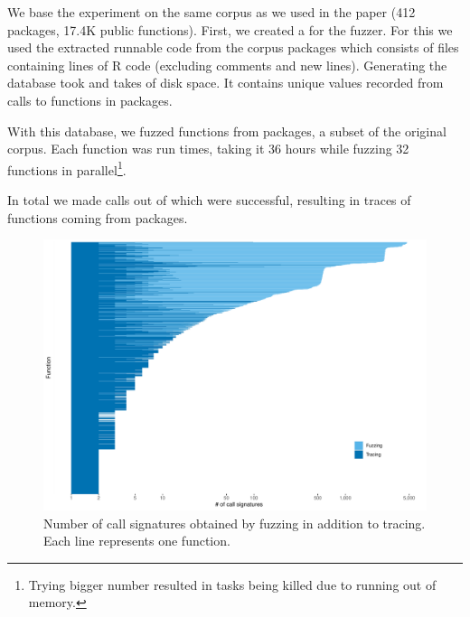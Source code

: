 \documentclass[sigplan,anonymous,review]{acmart}
\begin{document}
We base the experiment on the same corpus as we used in the \typer paper (412 packages, 17.4K public functions).
First, we created a \sxpdb for the fuzzer.
For this we used the extracted runnable code from the corpus packages which consists of \DBNumSourceFiles files containing \DBSourceLinesOfCodeRnd lines of R code (excluding comments and new lines).
Generating the database took  and takes \DBFileSize of disk space.
It contains \DBValuesRnd unique values recorded from \DBNumCallsRnd calls to \DBNumFunctionsRnd functions in \DBNumPackages packages.

With this database, we fuzzed \UFNumFunctions functions from \UFNumPackages packages, a subset of the original corpus.
Each function was run \UFTracingBudget times, taking it 36 hours while fuzzing 32 functions in parallel\footnote{Trying bigger number resulted in tasks being killed due to running out of memory.}.

In total we made \UFNumTracesRnd calls out of which \UFRatioSuccessTraces were successful, resulting in \UFNumSuccessTraces traces of \UFNumSuccessFunctions functions coming from \UFNumSuccessPackages packages.




\begin{figure}
    \centering
    \includegraphics[width=\columnwidth]{code-and-figures/uf-call-signatures.pdf}
    \caption{
        Number of call signatures obtained by fuzzing in addition to tracing. Each line represents one function.
    }\label{fig:sxpdb-pipeline}
\end{figure}
\end{document}
